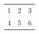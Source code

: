 \documentclass{article}
\begin{document}
\begin{NiceTabular}{ccc}
1 & 2 & 3 \\ 4 & 5 & 6 \\
\end{NiceTabular}
\end{document}
